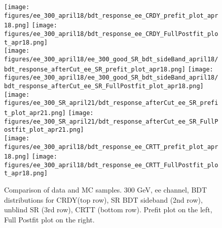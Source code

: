 \begin{figure}[tbp]
  \begin{center}
    \texttt{[image: figures/ee\_300\_april18/bdt\_response\_ee\_CRDY\_prefit\_plot\_apr18.png]}
    \texttt{[image: figures/ee\_300\_april18/bdt\_response\_ee\_CRDY\_FullPostfit\_plot\_apr18.png]}\\
    \texttt{[image: figures/ee\_300\_april18/ee\_300\_good\_SR\_bdt\_sideBand\_april18/bdt\_response\_afterCut\_ee\_SR\_prefit\_plot\_apr18.png]}
    \texttt{[image: figures/ee\_300\_april18/ee\_300\_good\_SR\_bdt\_sideBand\_april18/bdt\_response\_afterCut\_ee\_SR\_FullPostfit\_plot\_apr18.png]}\\
    \texttt{[image: figures/ee\_300\_SR\_april21/bdt\_response\_afterCut\_ee\_SR\_prefit\_plot\_apr21.png]}
    \texttt{[image: figures/ee\_300\_SR\_april21/bdt\_response\_afterCut\_ee\_SR\_FullPostfit\_plot\_apr21.png]}\\
    \texttt{[image: figures/ee\_300\_april18/bdt\_response\_ee\_CRTT\_prefit\_plot\_apr18.png]}
    \texttt{[image: figures/ee\_300\_april18/bdt\_response\_ee\_CRTT\_FullPostfit\_plot\_apr18.png]}\\
    \caption{Comparison of data and MC samples. 300 GeV, ee channel, BDT distributions for CRDY(top row), SR BDT sideband (2nd row), unblind SR (3rd row), CRTT (bottom row). Prefit plot on the left, Full Postfit plot on the right.}
    \label{fig:bdt_ee}
  \end{center}
\end{figure}


